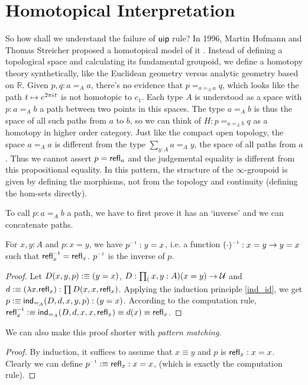 \section{Homotopical Interpretation}
So how shall we understand the failure of $\text{\sf uip}$ rule? In 1996,
Martin Hofmann and Thomas Streicher proposed a homotopical model of
it \cite{the-groupoid-Interpretation-of-type-theory}. Instead of
defining a topological space and calculating its fundamental groupoid,
we define a homotopy theory synthetically, like the Euclidean geometry
versus analytic geometry based on $\mathbb{R}$. Given $p,q:a=_A a$,
there's no evidence that $p=_{a=_Aa}q$, which looks like the path
$t\mapsto e^{2\pi{i\mkern1mu} t}$ is not homotopic to $c_1$. Each type $A$
is understood as a space with $p:a=_A b$ a path between two points in
this spaces. The type $a=_A b$ is thus the space of all such paths
from $a$ to $b$, so we can think of $H:p=_{a=_Ab}q$ as a homotopy in
higher order category. Just like the compact open topology, the space
$a=_Aa$ is different from the type $\sum_{y:A}a =_A y$, the space of
all paths from $a$. Thus we cannot assert $p=\text{\sf refl}_a$ and the judgemental
equality is different from this propositional equality. In this pattern,
the structure of the $\infty$-groupoid is given by defining the morphisms,
not from the topology and continuity (defining the hom-sets directly).

To call $p:a=_Ab$ a path, we have to first prove it has an `inverse' and
we can concatenate paths.

\begin{lemma}
    For $x,y:A$ and $p: x=y$, we have $p\inv: y=x$, i.e.
    a function $(\cdot)\inv: x=y\to y=x$ such that $\refl_x\inv=
    \refl_x$. $p\inv$ is the inverse of $p$.
\end{lemma}
\begin{proof}
    Let $D(x,y,p):\equiv(y=x)$, $D:\prod_(x,y:A)(x=y)\to\mathcal{U}$ and
    $d:\equiv(\lambda x.\text{\sf refl}_x):\prod D(x,x,\text{\sf refl}_x)$. Applying the
    induction principle \eqref{ind_id}, we get 
    $p:\equiv\text{\sf ind}_{=_A}(D,d,x,y,p):(y=x)$. According to the computation
    rule, $\refl_x\inv\defn \ind_{=_A}(D,d,x,x,\refl_x)\equiv d(x)\equiv
    \refl_x$.
\end{proof}
We can also make this proof shorter with {\it pattern matching}.
\begin{proof}
    By induction, it suffices to assume that $x\equiv y$ and $p$ is
    $\text{\sf refl}_x:x=x$. Clearly we can define $p\inv\defn \refl_x:x=x$, (which
    is exactly the computation rule).
\end{proof}

